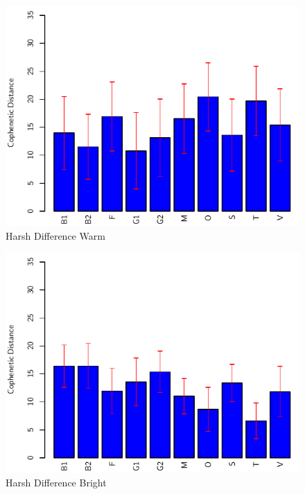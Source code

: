 		\begin{figure}[h!]
			\centering
			\includegraphics{chapter7/Images/HarshDifferenceWarmBar.pdf}
			\caption{Harsh Difference Warm}
		\end{figure}

		\begin{figure}[h!]
			\centering
			\includegraphics{chapter7/Images/HarshDifferenceBrightBar.pdf}
			\caption{Harsh Difference Bright}
		\end{figure}

